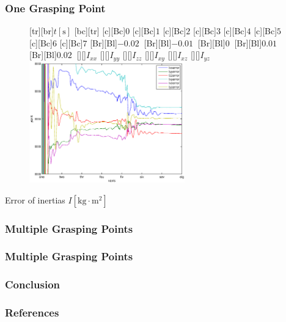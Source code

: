 \documentclass[student,noshadow]{ITRslides}
\begin{document}
\begin{frame}
	\frametitle{One Grasping Point}
	\begin{center}
		\begin{figure}
			[tr][br]{$t\left[\mathrm{s}\right]$}
			[bc][tr]{}
			[c][Bc]{$0$}
			[c][Bc]{$1$}
			[c][Bc]{$2$}
			[c][Bc]{$3$}
			[c][Bc]{$4$}
			[c][Bc]{$5$}
			[c][Bc]{$6$}
			[c][Bc]{$7$}
			[Br][Bl]{$-0.02\  $}
			[Br][Bl]{$-0.01\ $}
			[Br][Bl]{$0\  $}
			[Br][Bl]{$0.01\  $}
			[Br][Bl]{$0.02\  $}
			[][]{\tiny $I_{xx}$}
			[][]{\tiny $I_{yy}$}
			[][]{\tiny $I_{zz}$}
			[][]{\tiny $I_{xy}$}
			[][]{\tiny $I_{xz}$}
			[][]{\tiny $I_{yz}$}
			\includegraphics[width=0.6\textwidth]{fig/one_grasping_point_fast_inertias.eps}
		\end{figure}
		\vspace{0.4cm}
		Error of inertias $I \left[\mathrm{kg} \cdot \mathrm{m}^2\right]$
	\end{center}
\end{frame}

\begin{frame}
	\frametitle{Multiple Grasping Points}
\end{frame}

\begin{frame}
	\frametitle{Multiple Grasping Points}
\end{frame}

\begin{frame}
	\frametitle{Conclusion}
\end{frame}

\appendix
\begin{frame}
	\frametitle{References}
	\printbibliography
\end{frame}
\end{document}
